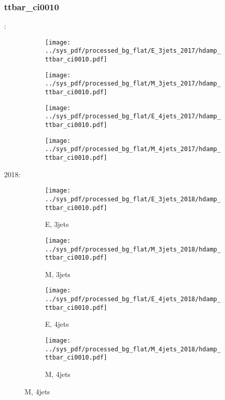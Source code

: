 \documentclass{beamer}
\begin{document}
\begin{frame}
\frametitle{ttbar_ci0010}
\fontsize{5}{1}:
\begin{figure}
\centering
\begin{subfigure}[b]{0.24\textwidth}
\texttt{[image: ../sys\_pdf/processed\_bg\_flat/E\_3jets\_2017/hdamp\_ttbar\_ci0010.pdf]}
\end{subfigure}
\begin{subfigure}[b]{0.24\textwidth}
\texttt{[image: ../sys\_pdf/processed\_bg\_flat/M\_3jets\_2017/hdamp\_ttbar\_ci0010.pdf]}
\end{subfigure}
\begin{subfigure}[b]{0.24\textwidth}
\texttt{[image: ../sys\_pdf/processed\_bg\_flat/E\_4jets\_2017/hdamp\_ttbar\_ci0010.pdf]}
\end{subfigure}
\begin{subfigure}[b]{0.24\textwidth}
\texttt{[image: ../sys\_pdf/processed\_bg\_flat/M\_4jets\_2017/hdamp\_ttbar\_ci0010.pdf]}
\end{subfigure}
\end{figure}
2018:
\begin{figure}
\centering
\begin{subfigure}[b]{0.24\textwidth}
\texttt{[image: ../sys\_pdf/processed\_bg\_flat/E\_3jets\_2018/hdamp\_ttbar\_ci0010.pdf]}
\captionsetup{font=tiny}
\caption{E, 3jets}
\end{subfigure}
\begin{subfigure}[b]{0.24\textwidth}
\texttt{[image: ../sys\_pdf/processed\_bg\_flat/M\_3jets\_2018/hdamp\_ttbar\_ci0010.pdf]}
\captionsetup{font=tiny}
\caption{M, 3jets}
\end{subfigure}
\begin{subfigure}[b]{0.24\textwidth}
\texttt{[image: ../sys\_pdf/processed\_bg\_flat/E\_4jets\_2018/hdamp\_ttbar\_ci0010.pdf]}
\captionsetup{font=tiny}
\caption{E, 4jets}
\end{subfigure}
\begin{subfigure}[b]{0.24\textwidth}
\texttt{[image: ../sys\_pdf/processed\_bg\_flat/M\_4jets\_2018/hdamp\_ttbar\_ci0010.pdf]}
\captionsetup{font=tiny}
\caption{M, 4jets}
\end{subfigure}
\end{figure}
\end{frame}
\end{document}

